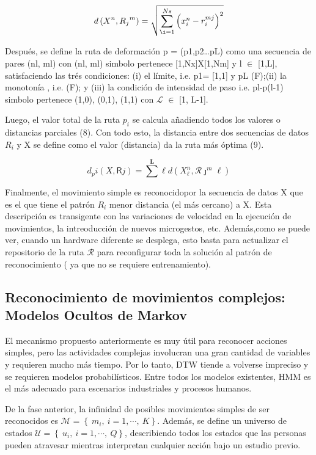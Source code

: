 \documentclass{article}
\begin{document}
\begin{equation}d\left({X}^n , {R_j}^m\right)= \sqrt{\sum_{ \i = 1}^{Ns}\left(x_i^n-r_i^{mj}\right)^2 }  \end{equation}

  Después, se define la ruta de deformación p = (p1,p2…pL) como una secuencia de pares (nl, ml) con (nl, ml) simbolo pertenece [1,Nx]X[1,Nm] y l $\in$ [1,L], satisfaciendo las trés condiciones: (i) el límite, i.e. p1= [1,1] y pL (F);(ii) la monotonía , i.e. (F); y (iii) la condición de intensidad de paso i.e. pl-p(l-1) simbolo pertenece {(1,0), (0,1), (1,1)} con $\mathcal{L}$ $\in$ [1, L-1].

  Luego, el valor total de la ruta $p_i$ se calcula añadiendo todos los valores o distancias parciales (8). Con todo esto, la distancia entre dos secuencias de datos $R_i$ y X se define como el valor (distancia) da la ruta más óptima (9).

\begin{equation}d_p{i}\left(X ,\mathsf{R}j\right)=\sum^\mathbf{L}\ell d\left(X^n_\ell,\mathcal{R}\jmath^m\ell\right)\end{equation}


  Finalmente, el movimiento simple es reconocidopor la secuencia de datos X que es el que tiene el patrón $R_i$ menor distancia (el más cercano) a X. Esta descripción es transigente con las variaciones de velocidad en la ejecución de movimientos, la intreoducción de nuevos microgestos, etc. Además,como se puede ver, cuando un hardware diferente se desplega, esto basta para actualizar el repositorio de la ruta $\mathcal{R}$ para reconfigurar toda la solución al patrón de reconocimiento ( ya que no se requiere entrenamiento).

\subsection{Reconocimiento de movimientos complejos: Modelos Ocultos de Markov}

El mecanismo propuesto anteriormente es muy útil para reconocer acciones simples, pero las actividades complejas involucran una gran cantidad de variables y requieren mucho más tiempo.
Por lo tanto, DTW tiende a volverse impreciso y se requieren modelos probabilísticos. Entre todos los modelos existentes, HMM es el más adecuado para escenarios industriales y procesos humanos.

De la fase anterior, la infinidad de posibles movimientos simples de ser reconocidos es $\mathcal{M} =  \left\lbrace \ m_i,\ i=1,\cdots , \ K \right\rbrace$. Además, se define un universo de estados  $\mathcal{U} =  \left\lbrace \ u_i,\ i=1,\cdots , \ Q \right\rbrace$, describiendo todos los estados que las personas pueden atravesar mientras interpretan cualquier acción bajo un estudio previo.
\end{document}
